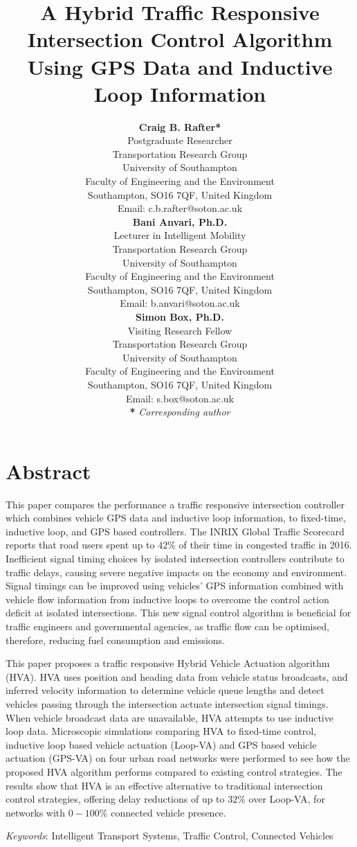 \documentclass[numbered]{trbunofficial}
\title{A Hybrid Traffic Responsive Intersection Control Algorithm Using GPS Data and Inductive Loop Information}
\author{%
	\textbf{Craig B. Rafter*}\\
		Postgraduate Researcher\\
		Transportation Research Group\\
		University of Southampton\\
		Faculty of Engineering and the Environment\\
		Southampton, SO16 7QF, United Kingdom\\
		Email: c.b.rafter@soton.ac.uk\\
	\hfill\break%
	\hfill\break%
	\textbf{Bani Anvari, Ph.D.}\\
		Lecturer in Intelligent Mobility\\
		Transportation Research Group\\
		University of Southampton\\
		Faculty of Engineering and the Environment\\
		Southampton, SO16 7QF, United Kingdom\\
		Email: b.anvari@soton.ac.uk\\
	\hfill\break
	\hfill\break
	\textbf{Simon Box, Ph.D.}\\
		Visiting Research Fellow\\
		Transportation Research Group\\
		University of Southampton\\
		Faculty of Engineering and the Environment\\
		Southampton, SO16 7QF, United Kingdom\\
		Email: s.box@soton.ac.uk\\
	\hfill\break
	\hfill\break
	\textbf{*} \emph{Corresponding author}
}
\begin{document}
\begin{nolinenumbers}
	\maketitle
\end{nolinenumbers}


\section{Abstract}

This paper compares the performance a traffic responsive intersection controller which combines vehicle GPS data and inductive loop information, to fixed-time, inductive loop, and GPS based controllers. 
The INRIX Global Traffic Scorecard reports that road users spent up to $42\%$ of their time in congested traffic in 2016. 
Inefficient signal timing choices by isolated intersection controllers contribute to traffic delays, causing severe negative impacts on the economy and environment. 
Signal timings can be improved using vehicles' GPS information combined with vehicle flow information from inductive loops to overcome the control action deficit at isolated intersections. 
This new signal control algorithm is beneficial for traffic engineers and governmental agencies, as traffic flow can be optimised, therefore, reducing fuel consumption and emissions.

This paper proposes a traffic responsive Hybrid Vehicle Actuation algorithm (HVA). HVA uses position and heading data from vehicle status broadcasts, and inferred velocity information to determine vehicle queue lengths and detect vehicles passing through the intersection actuate intersection signal timings. When vehicle broadcast data are unavailable, HVA attempts to use inductive loop data.
Microscopic simulations comparing HVA to fixed-time control, inductive loop based vehicle actuation (Loop-VA) and GPS based vehicle actuation (GPS-VA) on four urban road networks were performed to see how the proposed HVA algorithm performs compared to existing control strategies. 
The results show that HVA is an effective alternative to traditional intersection control strategies, offering delay reductions of up to ${32\%}$ over Loop-VA, for networks with $0-100\%$ connected vehicle presence.

\hfill\break%
\noindent\textit{Keywords}: Intelligent Transport Systems, Traffic Control, Connected Vehicles
\newpage
\end{document}
